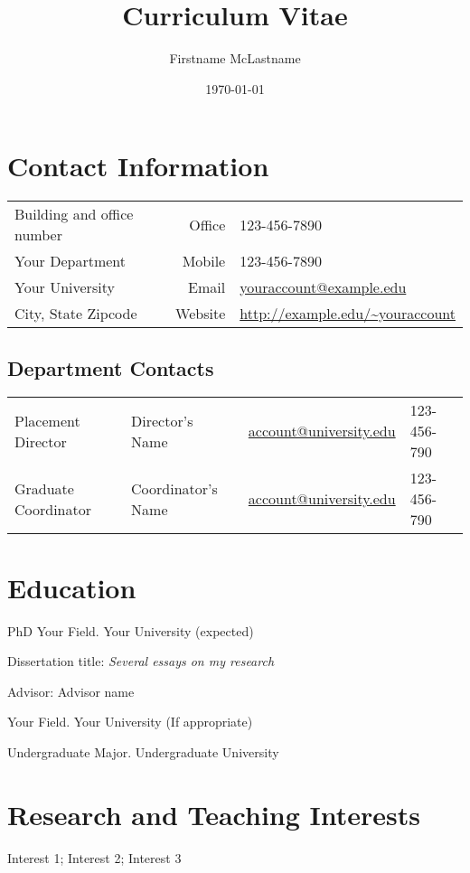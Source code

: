 \documentclass[12pt]{safecv}%
\author{Firstname McLastname}
\title{Curriculum Vitae}
\date{\today}
\begin{document}
\maketitle
\section*{Contact Information}
\begin{tabular}{@{}lrl@{}}
Building and office number & Office  & 123-456-7890                         \\
Your Department            & Mobile  & 123-456-7890                         \\
Your University            & Email   & \url{youraccount@example.edu}        \\
City, State Zipcode        & Website & \url{http://example.edu/~youraccount} %
\end{tabular}

\subsection*{Department Contacts}
\begin{tabular}{@{}llll@{}}
Placement Director & Director's Name & \url{account@university.edu} & 123-456-790 \\
Graduate Coordinator & Coordinator's Name & \url{account@university.edu} & 123-456-790
\end{tabular}

\section*{Education}

\begin{description}[noitemsep]
\item[year] PhD Your Field. Your University (expected)
\item Dissertation title: \textit{Several essays on my research} %
\item Advisor: Advisor name
\item[year]  Your Field. Your University (If appropriate)
\item[year]  Undergraduate Major. Undergraduate University
\end{description}

\section*{Research and Teaching Interests}
Interest 1; Interest 2; Interest 3
\end{document}
